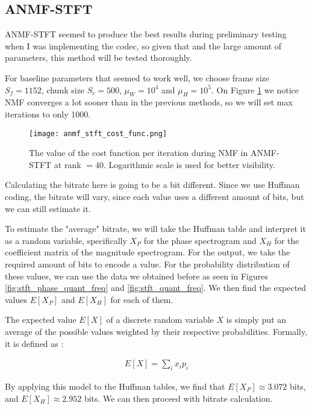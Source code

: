 \subsection{ANMF-STFT}
ANMF-STFT seemed to produce the best results during preliminary testing when I was implementing the codec, so given that and the large amount of parameters, this method will be tested thoroughly.

For baseline parameters that seemed to work well, we choose frame size $S_f = 1152$, chunk size $S_c = 500$, $\mu_W = 10^4$ and $\mu_H = 10^5$. On Figure \ref{fig:anmf_stft_cost_func} we notice NMF converges a lot sooner than in the previous methods, so we will set max iterations to only 1000.

\begin{figure}[ht]
	\caption[ANMF-STFT cost function]{The value of the cost function per iteration during NMF in ANMF-STFT at rank $= 40$. Logarithmic scale is used for better visibility.}
	\label{fig:anmf_stft_cost_func}
	\centering
	\texttt{[image: anmf\_stft\_cost\_func.png]}
\end{figure}

Calculating the bitrate here is going to be a bit different. Since we use Huffman coding, the bitrate will vary, since each value uses a different amount of bits, but we can still estimate it.

To estimate the "average" bitrate, we will take the Huffman table and interpret it as a random variable, specifically $X_P$ for the phase spectrogram and $X_H$ for the coefficient matrix of the magnitude spectrogram. For the output, we take the required amount of bits to encode a value. For the probability distribution of these values, we can use the data we obtained before as seen in Figures \ref{fig:stft_phase_quant_freq} and \ref{fig:stft_quant_freq}. We then find the expected values $E[X_P]$ and $E[X_H]$ for each of them.

The expected value $E[X]$ of a discrete random variable $X$ is simply put an average of the possible values weighted by their respective probabilities. Formally, it is defined as \cite{Ross1972IntroductionTP}:

\begin{align}
E[X] = \sum_{i}x_ip_i
\end{align}

By applying this model to the Huffman tables, we find that $E[X_P] \approx 3.072$ bits, and $E[X_H] \approx 2.952$ bits. We can then proceed with bitrate calculation.

